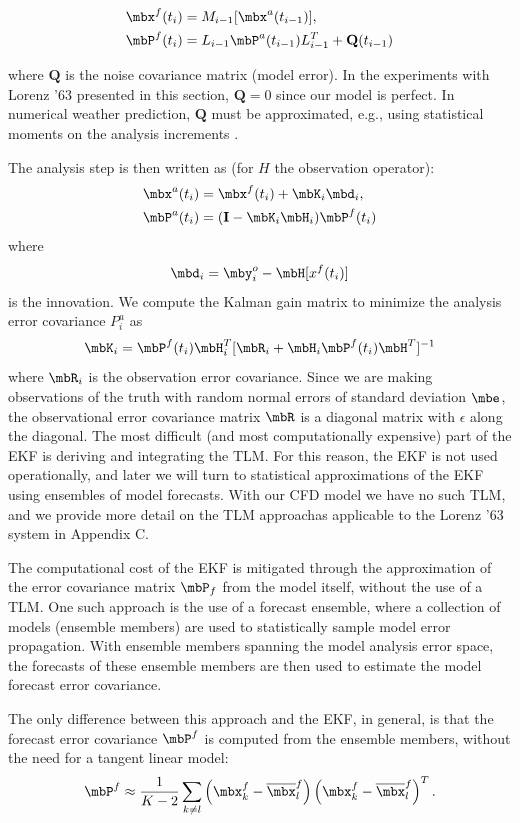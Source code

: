 \begin{align*} \mbx^f (t_i) &= M _{i-1} [\mbx ^a (t_{i-1} ) ],\\
\mbP^f (t_i ) &= L_{i-1} \mbP^a (t_{i-1} ) L^T _{i-1} + \mathbf{Q} (t_{i-1} ) \end{align*}

where $\mathbf{Q}$ is the noise covariance matrix (model error).
In the experiments with Lorenz '63 presented in this section, $\mathbf{Q} = 0$ since our model is perfect.
In numerical weather prediction, $\mathbf{Q}$ must be approximated, e.g., using statistical moments on the analysis increments \cite{danforth2007estimating,li2009accounting}.

The analysis step is then written as (for $H$ the observation operator):
\begin{align} \mbx^a (t_i ) &= \mbx^f (t_i) + \mbK_i \mbd_i,\\
\mbP^a (t_i) &= (\mathbf{I} - \mbK_i \mbH_i )\mbP^f (t_i) \end{align}
where
\[ \mbd_i = \mby_i^o - \mbH[x^f (t_i) ] \]
is the innovation. We compute the Kalman gain matrix to minimize the analysis error covariance $P^a _i$ as
\[ \mbK_i = \mbP^f (t_i) \mbH_i ^T [ \mbR_i + \mbH_i \mbP^f (t_i) \mbH^T ] ^{-1} \]
where $\mbR_i$ is the observation error covariance.
Since we are making observations of the truth with random normal errors of standard deviation $\mbe$, the observational error covariance matrix $\mbR$ is a diagonal matrix with $\epsilon$ along the diagonal.
The most difficult (and most computationally expensive) part of the EKF is deriving and integrating the TLM.
For this reason, the EKF is not used operationally, and later we will turn to statistical approximations of the EKF using ensembles of model forecasts.
With our CFD model we have no such TLM, and we provide more detail on the TLM approachas applicable to the Lorenz '63 system in Appendix C.

The computational cost of the EKF is mitigated through the approximation of the error covariance matrix $\mbP_f$ from the model itself, without the use of a TLM.
One such approach is the use of a forecast ensemble, where a collection of models (ensemble members) are used to statistically sample model error propagation.
With ensemble members spanning the model analysis error space, the forecasts of these ensemble members are then used to estimate the model forecast error covariance.

The only difference between this approach and the EKF, in general, is that the forecast error covariance $\mbP^f$ is computed from the ensemble members, without the need for a tangent linear model:
\[ \mbP^f \approx \frac{1}{K-2} \sum _{k\neq l} \left ( \mbx_k ^f - \overline{\mbx} ^f _l \right ) \left (\mbx_k ^f - \overline{\mbx} ^f _l \right ) ^T .\]

